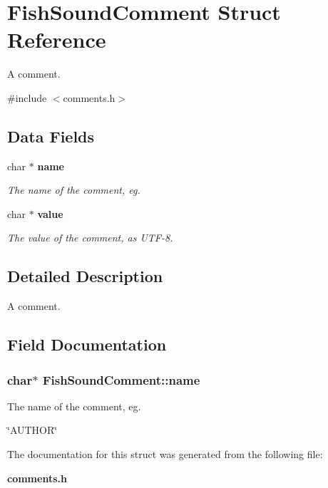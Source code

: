 \section{\-Fish\-Sound\-Comment \-Struct \-Reference}
\label{structFishSoundComment}


\-A comment.  




{\ttfamily \#include $<$comments.\-h$>$}

\subsection*{\-Data \-Fields}
\begin{DoxyCompactItemize}
\item 
char $\ast$ {\bf name}
\begin{DoxyCompactList}\small\item\em \-The name of the comment, eg. \end{DoxyCompactList}\item 
char $\ast$ {\bf value}\label{structFishSoundComment_a4293f69fe0e695fc9102e1667ce9add1}

\begin{DoxyCompactList}\small\item\em \-The value of the comment, as \-U\-T\-F-\/8. \end{DoxyCompactList}\end{DoxyCompactItemize}


\subsection{\-Detailed \-Description}
\-A comment. 

\subsection{\-Field \-Documentation}
\subsubsection[{name}]{\setlength{\rightskip}{0pt plus 5cm}char$\ast$ {\bf \-Fish\-Sound\-Comment\-::name}}\label{structFishSoundComment_aededfdcebf50dc81cce9d714e5cda6df}


\-The name of the comment, eg. 

\char`\"{}\-A\-U\-T\-H\-O\-R\char`\"{} 

\-The documentation for this struct was generated from the following file\-:\begin{DoxyCompactItemize}
\item 
{\bf comments.\-h}\end{DoxyCompactItemize}
